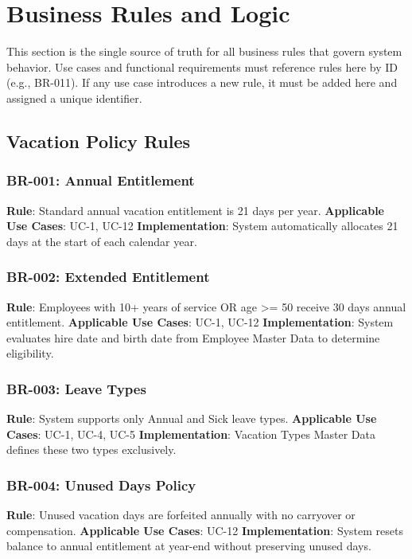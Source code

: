 \documentclass[12pt,a4paper]{article}
\begin{document}
\section{Business Rules and Logic}

This section is the single source of truth for all business rules that govern system behavior. Use cases and functional requirements must reference rules here by ID (e.g., BR-011). If any use case introduces a new rule, it must be added here and assigned a unique identifier.

\subsection{Vacation Policy Rules}

\subsubsection{BR-001: Annual Entitlement}
\textbf{Rule}: Standard annual vacation entitlement is 21 days per year.
\textbf{Applicable Use Cases}: UC-1, UC-12
\textbf{Implementation}: System automatically allocates 21 days at the start of each calendar year.

\subsubsection{BR-002: Extended Entitlement}
\textbf{Rule}: Employees with 10+ years of service OR age >= 50 receive 30 days annual entitlement.
\textbf{Applicable Use Cases}: UC-1, UC-12
\textbf{Implementation}: System evaluates hire date and birth date from Employee Master Data to determine eligibility.

\subsubsection{BR-003: Leave Types}
\textbf{Rule}: System supports only Annual and Sick leave types.
\textbf{Applicable Use Cases}: UC-1, UC-4, UC-5
\textbf{Implementation}: Vacation Types Master Data defines these two types exclusively.

\subsubsection{BR-004: Unused Days Policy}
\textbf{Rule}: Unused vacation days are forfeited annually with no carryover or compensation.
\textbf{Applicable Use Cases}: UC-12
\textbf{Implementation}: System resets balance to annual entitlement at year-end without preserving unused days.
\end{document}
